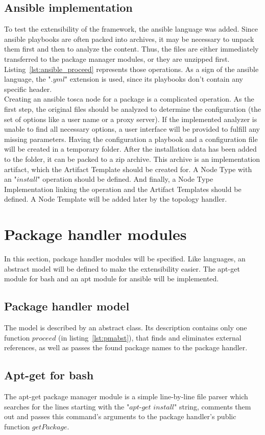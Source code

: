 \subsection*{Ansible implementation}
To test the extensibility of the framework, the ansible language was added.
Since ansible playbooks are often packed into archives, it may be necessary to unpack them first and then to analyze the content.
Thus, the files are either immediately transferred to the package manager modules, or they are unzipped first.
Listing~\ref{lst:ansible_proceed} represents those operations.
As a sign of the ansible language, the ".$yml$" extension is used, since its playbooks don't contain any specific header.\\
Creating an ansible \gls{tosca} node for a package is a complicated operation. 
As the first step, the original files should be analyzed to determine the configuration (the set of options like a user name or a proxy server).
If the implemented analyzer is unable to find all necessary options, a user interface will be provided to fulfill any missing parameters.
Having the configuration a playbook and a configuration file will be created in a temporary folder.
After the installation data has been added to the folder, it can be packed to a zip archive.
This archive is an implementation artifact, which the Artifact Template should be created for.
A Node Type with an "$install$" operation %
should be defined.
And finally, a Node Type Implementation linking the operation and the Artifact Templates should be defined.
A Node Template will be added later by the topology handler.

\section{Package handler modules}
In this section, package handler modules will be specified.
Like languages, an abstract model will be defined to make the extensibility easier.
The apt-get module for bash and an apt module for ansible will be implemented.
\subsection*{Package handler model}
The model is described by an abstract class.
Its description contains only one function $proceed$ (in  listing~\ref{lst:pmabst}), that finds and eliminates external references, as well as passes the found package names to the package handler.
\subsection*{Apt-get for bash}
The apt-get package manager module is a simple line-by-line file parser which searches for the lines starting with the "$apt$-$get$ $install$" string, comments them out and passes this command's arguments to the package handler's public function $getPackage$. 
